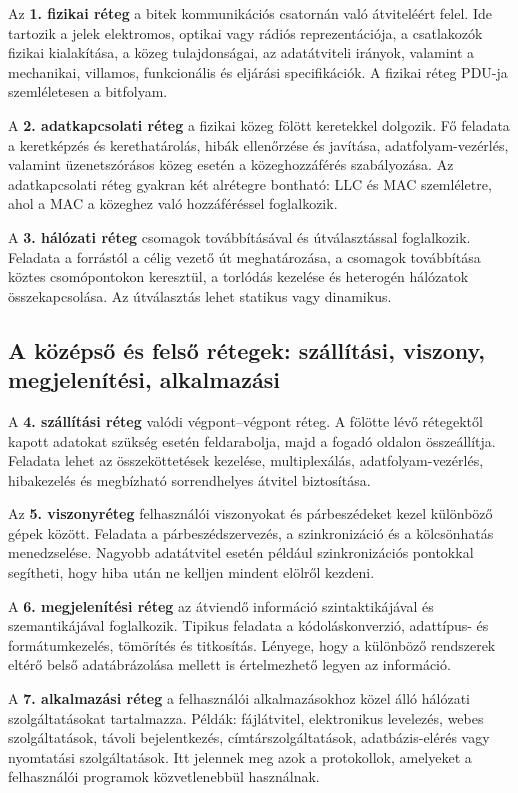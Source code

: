 Az \textbf{1. fizikai réteg} a bitek kommunikációs csatornán való átviteléért felel. Ide tartozik a jelek elektromos, optikai vagy rádiós reprezentációja, a csatlakozók fizikai kialakítása, a közeg tulajdonságai, az adatátviteli irányok, valamint a mechanikai, villamos, funkcionális és eljárási specifikációk. A fizikai réteg PDU-ja szemléletesen a bitfolyam.

A \textbf{2. adatkapcsolati réteg} a fizikai közeg fölött keretekkel dolgozik. Fő feladata a keretképzés és kerethatárolás, hibák ellenőrzése és javítása, adatfolyam-vezérlés, valamint üzenetszórásos közeg esetén a közeghozzáférés szabályozása. Az adatkapcsolati réteg gyakran két alrétegre bontható: LLC és MAC szemléletre, ahol a MAC a közeghez való hozzáféréssel foglalkozik.

A \textbf{3. hálózati réteg} csomagok továbbításával és útválasztással foglalkozik. Feladata a forrástól a célig vezető út meghatározása, a csomagok továbbítása köztes csomópontokon keresztül, a torlódás kezelése és heterogén hálózatok összekapcsolása. Az útválasztás lehet statikus vagy dinamikus.

\subsection{A középső és felső rétegek: szállítási, viszony, megjelenítési, alkalmazási}

A \textbf{4. szállítási réteg} valódi végpont--végpont réteg. A fölötte lévő rétegektől kapott adatokat szükség esetén feldarabolja, majd a fogadó oldalon összeállítja. Feladata lehet az összeköttetések kezelése, multiplexálás, adatfolyam-vezérlés, hibakezelés és megbízható sorrendhelyes átvitel biztosítása.

Az \textbf{5. viszonyréteg} felhasználói viszonyokat és párbeszédeket kezel különböző gépek között. Feladata a párbeszédszervezés, a szinkronizáció és a kölcsönhatás menedzselése. Nagyobb adatátvitel esetén például szinkronizációs pontokkal segítheti, hogy hiba után ne kelljen mindent elölről kezdeni.

A \textbf{6. megjelenítési réteg} az átviendő információ szintaktikájával és szemantikájával foglalkozik. Tipikus feladata a kódoláskonverzió, adattípus- és formátumkezelés, tömörítés és titkosítás. Lényege, hogy a különböző rendszerek eltérő belső adatábrázolása mellett is értelmezhető legyen az információ.

A \textbf{7. alkalmazási réteg} a felhasználói alkalmazásokhoz közel álló hálózati szolgáltatásokat tartalmazza. Példák: fájlátvitel, elektronikus levelezés, webes szolgáltatások, távoli bejelentkezés, címtárszolgáltatások, adatbázis-elérés vagy nyomtatási szolgáltatások. Itt jelennek meg azok a protokollok, amelyeket a felhasználói programok közvetlenebbül használnak.

